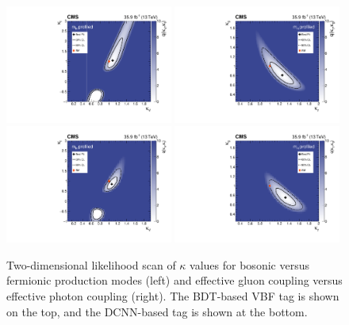 \begin{figure}[h!]
    \begin{center}
        \includegraphics[width=0.49\textwidth]{figures/stats_results/CMS-HIG-16-040_Figure_020-a.pdf}
        \includegraphics[width=0.49\textwidth]{figures/stats_results/CMS-HIG-16-040_Figure_020-b.pdf}
        \includegraphics[width=0.49\textwidth]{figures/stats_results/CVCFScanProfileMH_col.pdf}
        \includegraphics[width=0.49\textwidth]{figures/stats_results/KGluKGamScanProfileMH_col.pdf}
    \end{center}
    \caption{Two-dimensional likelihood scan of $\kappa$ values for bosonic versus fermionic production modes (left) and effective gluon coupling versus effective photon coupling (right).
             The BDT-based VBF tag is shown on the top, and the DCNN-based tag is shown at the bottom.}
        \label{fig:stats_results:kappa}
\end{figure}

